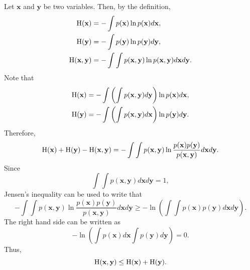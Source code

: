 \subsection{}
\label{1.31}
Let $\mathbf{x}$ and $\mathbf{y}$ be two variables.
Then, by the definition, 
%
\begin{equation}
\begin{aligned}
{\rm H}(\mathbf{x}) 
&= 
- 
\int
p(\mathbf{x}) 
\ln p(\mathbf{x}) 
d\mathbf{x}, \\
{\rm H}(\mathbf{y}) 
&= 
- 
\int 
p(\mathbf{y}) 
\ln p(\mathbf{y}) 
d\mathbf{y}, \\
{\rm H}(\mathbf{x}, \mathbf{y}) 
&= 
- 
\int 
\int 
p(\mathbf{x}, \mathbf{y}) 
\ln p(\mathbf{x}, \mathbf{y}) 
d\mathbf{x} 
d\mathbf{y}.
\end{aligned}
\end{equation}
%
Note that
%
\begin{equation}
\begin{aligned}
{\rm H}(\mathbf{x}) 
&= 
- 
\int 
\left( 
	\int 
	p(\mathbf{x}, \mathbf{y}) 
	d\mathbf{y} 
\right) 
\ln p(\mathbf{x}) 
d\mathbf{x}, \\
{\rm H}(\mathbf{y}) 
&= 
- 
\int 
\left( 
	\int p(\mathbf{x}, \mathbf{y}) 
	d\mathbf{x} 
\right) 
\ln p(\mathbf{y}) 
d\mathbf{y}.
\end{aligned}
\end{equation}
%
Therefore,
%
\begin{equation}
{\rm H}(\mathbf{x}) 
+ 
{\rm H}(\mathbf{y}) 
- 
{\rm H}(\mathbf{x}, \mathbf{y}) 
= 
- 
\int 
\int 
p(\mathbf{x}, \mathbf{y}) 
\ln \frac{p(\mathbf{x}) p(\mathbf{y})}{p(\mathbf{x}, \mathbf{y})} 
d\mathbf{x} 
d\mathbf{y}.
\end{equation}
%
Since
%
\begin{equation}
\int 
\int 
p(\mathbf{x}, \mathbf{y}) 
d\mathbf{x} 
d\mathbf{y} 
=
1,
\end{equation}
%
Jensen's inequality can be used to write that
%
\begin{equation}
- 
\int 
\int 
p(\mathbf{x}, \mathbf{y}) 
\ln \frac{p(\mathbf{x}) p(\mathbf{y})}{p(\mathbf{x}, \mathbf{y})} 
d\mathbf{x} d\mathbf{y} 
\geq 
- 
\ln 
\left( 
	\int 
	\int 
	p(\mathbf{x}) 
	p(\mathbf{y}) 
	d\mathbf{x} 
	d\mathbf{y} 
\right).
\end{equation}
%
The right hand side can be written as
%
\begin{equation}
- 
\ln 
\left( 
	\int 
	p(\mathbf{x}) 
	d\mathbf{x} 
	\int  
	p(\mathbf{y}) 
	d\mathbf{y} 
\right) 
= 
0.
\end{equation}
%
Thus,
%
\begin{equation}
{\rm H}(\mathbf{x}, \mathbf{y}) 
\leq 
{\rm H}(\mathbf{x}) 
+ 
{\rm H}(\mathbf{y}).
\end{equation}
%


